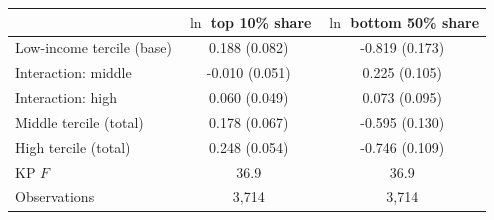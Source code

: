 \begin{tabular}{lcc}
\toprule
 & $\ln$ top 10\% share & $\ln$ bottom 50\% share \\
\midrule
Low-income tercile (base) & 0.188\sym{**} (0.082) & -0.819\sym{***} (0.173) \\
\quad Interaction: middle & -0.010 (0.051) & 0.225\sym{**} (0.105) \\
\quad Interaction: high & 0.060 (0.049) & 0.073 (0.095) \\
Middle tercile (total) & 0.178\sym{***} (0.067) & -0.595\sym{***} (0.130) \\
High tercile (total) & 0.248\sym{***} (0.054) & -0.746\sym{***} (0.109) \\
\midrule
KP $F$ & 36.9 & 36.9 \\
Observations & 3,714 & 3,714 \\
\bottomrule
\end{tabular}
